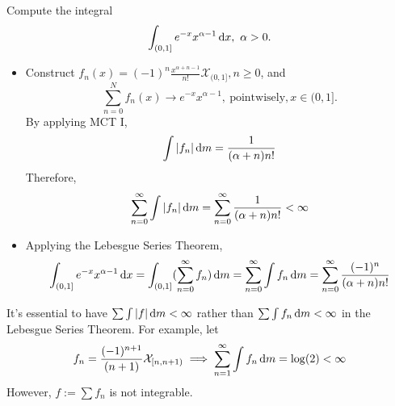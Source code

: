 \begin{example}
Compute the integral
\[
\int_{(0,1]}e^{-x}x^{\alpha-1}\diff x,\ \alpha>0.
\]
\begin{itemize}
\item
Construct $f_n(x) = (-1)^n\frac{x^{\alpha+n-1}}{n!}\mathcal{X}_{(0,1]}, n\ge0$, and
\[
\sum_{n=0}^N f_n(x)\to e^{-x}x^{\alpha-1}, \ \text{pointwisely}, x\in(0,1]. 
\]
By applying MCT I,
\[
\int|f_n|\,\mathrm{d} m=\frac{1}{(\alpha+n)n!}
\]
Therefore, 
\[
\sum_{n=0}^\infty\int|f_n|\,\mathrm{d} m=
\sum_{n=0}^\infty\frac{1}{(\alpha+n)n!}<\infty
\]
\item
Applying the Lebesgue Series Theorem,
\[
\int_{(0,1]}e^{-x}x^{\alpha-1}\,\mathrm{d} x = 
\int_{(0,1]}(\sum_{n=0}^\infty f_n)\,\mathrm{d} m
=
\sum_{n=0}^\infty\int f_n\,\mathrm{d} m=
\sum_{n=0}^\infty\frac{(-1)^n}{(\alpha+n)n!}
\]
\end{itemize}
\end{example}

\begin{remark}
It's essential to have $\sum\int|f|\,\mathrm{d} m<\infty$ rather than $\sum\int f_n\,\mathrm{d} m<\infty$ in the Lebesgue Series Theorem.
For example, let
\[
f_n=\frac{(-1)^{n+1}}{(n+1)}\mathcal{X}_{[n,n+1)}
\implies
\sum_{n=1}^\infty\int f_n\,\mathrm{d} m =\log(2)<\infty
\]
However, $f:=\sum f_n$ is not integrable.
\end{remark}


